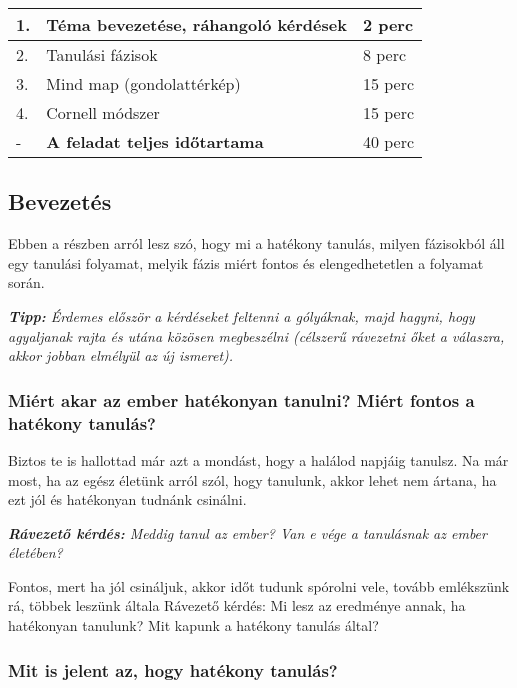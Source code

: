 \documentclass[../Main.tex]{subfiles}
\begin{document}
\begin{center}
    \begin{tabular}{| m{1.3 em} | m{} | m{} |}
    \hline
    1. & Téma bevezetése, ráhangoló kérdések & 2 perc \\
    \hline
    2. & Tanulási fázisok & 8 perc \\
    \hline
    3. & Mind map (gondolattérkép) & 15 perc \\
    \hline
    4. & Cornell módszer & 15 perc \\
    \hline
    - & \textbf{A feladat teljes időtartama} & 40 perc \\
    \hline
    \end{tabular}
\end{center}

\subsection{Bevezetés}

Ebben a részben arról lesz szó, hogy mi a hatékony tanulás, milyen fázisokból áll egy tanulási folyamat,
melyik fázis miért fontos és elengedhetetlen a folyamat során.

\textit{\textbf{Tipp:} Érdemes először a kérdéseket feltenni a gólyáknak, majd hagyni,
hogy agyaljanak rajta és utána közösen megbeszélni (célszerű rávezetni őket a válaszra, akkor jobban elmélyül az új ismeret).} \par

\subsubsection{Miért akar az ember hatékonyan tanulni? \newline Miért fontos a hatékony tanulás?}

Biztos te is hallottad már azt a mondást, hogy a halálod napjáig tanulsz.
Na már most, ha az egész életünk arról szól, hogy tanulunk, akkor lehet nem ártana,
ha ezt jól és hatékonyan tudnánk csinálni.

\textit{\textbf{Rávezető kérdés:} Meddig tanul az ember? Van e vége a tanulásnak az ember életében?}


Fontos, mert ha jól csináljuk, akkor időt tudunk spórolni vele, tovább emlékszünk rá, többek leszünk általa
Rávezető kérdés: Mi lesz az eredménye annak, ha hatékonyan tanulunk? Mit kapunk a hatékony tanulás által?

    
\subsubsection{Mit is jelent az, hogy hatékony tanulás?}
\end{document}

